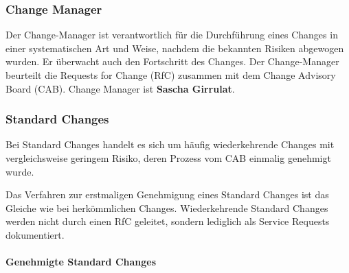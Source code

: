 \documentclass[]{article}
\let\oldparagraph\paragraph
\renewcommand{\paragraph}[1]{\oldparagraph{#1}\mbox{}}
\begin{document}
\subsubsection{Change Manager}\label{change-manager}

Der Change-Manager ist verantwortlich für die Durchführung eines Changes
in einer systematischen Art und Weise, nachdem die bekannten Risiken
abgewogen wurden. Er überwacht auch den Fortschritt des Changes. Der
Change-Manager beurteilt die Requests for Change (RfC) zusammen mit dem
Change Advisory Board (CAB). Change Manager ist \textbf{Sascha
Girrulat}.

\subsubsection{Standard Changes}\label{standard-changes}

Bei Standard Changes handelt es sich um häufig wiederkehrende Changes
mit vergleichsweise geringem Risiko, deren Prozess vom CAB einmalig
genehmigt wurde.

Das Verfahren zur erstmaligen Genehmigung eines Standard Changes ist das
Gleiche wie bei herkömmlichen Changes. Wiederkehrende Standard Changes
werden nicht durch einen RfC geleitet, sondern lediglich als Service
Requests dokumentiert.

\paragraph{Genehmigte Standard Changes}\label{genehmigte-standard-changes}
\end{document}
